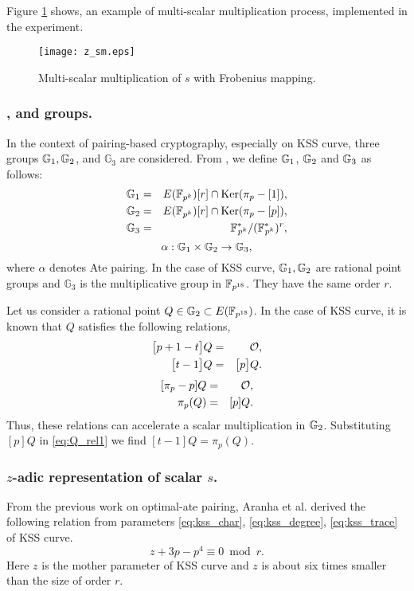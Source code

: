 Figure \ref{fig:z_sml} shows, an example of multi-scalar multiplication process, implemented in the experiment.
\begin{figure}[!ht]
\centering
\texttt{[image: z\_sm.eps]}
\caption{Multi-scalar multiplication of $s$ with Frobenius mapping.}
\label{fig:z_sml}
\end{figure}

\subsubsection{,  and  groups.} In the context of pairing-based cryptography, especially on KSS curve, three groups ${\mathbb{G}}_{1}, {\mathbb{G}}_{2}$, and $\mathbb{G}_3$ are considered. From \cite{mori}, we define ${\mathbb{G}}_{1}$, ${\mathbb{G}}_{2}$ and ${\mathbb{G}}_{3}$ as follows:
\begin{eqnarray}\label{eq:g1}
{\mathbb{G}}_{1} & = &  E({\mathbb{F}}_{p^{k}}) [r] \cap \text{Ker}(\pi_p - [1]), \nonumber \\
{\mathbb{G}}_{2} & = &  E({\mathbb{F}}_{p^{k}}) [r] \cap \text{Ker}(\pi_p - [p]), \nonumber \\
{\mathbb{G}}_{3} & = & {{\mathbb{F}}^{\ast}}_{\!\!\!p^{k}}/({{\mathbb{F}}^{\ast}}_{\!\!\!p^{k}})^r, \nonumber
\end{eqnarray}
\begin{equation}
\alpha : {\mathbb{G}}_{1} \times {\mathbb{G}}_{2} \rightarrow {\mathbb{G}}_{3},
\end{equation}
where $\alpha$ denotes Ate pairing. In the case of KSS curve, ${\mathbb{G}}_{1}, {\mathbb{G}}_{2}$ are rational point groups and $\mathbb{G}_3$ is the multiplicative group in $\mathbb{F}_{p^{18}}$. They have the same order $r$. 

Let us consider a rational point $Q\in {\mathbb{G}}_{2} \subset E({\mathbb{F}}_{p^{18}})$.
In the case of KSS curve, it is known that $Q$ satisfies the following relations,
\begin{eqnarray}\label{eq:Q_rel1}
\big[p+1-t\big]Q & = & \cal O, \nonumber \\
\big[t-1\big]Q  & = & \big[p\big]Q.
\end{eqnarray}
\begin{eqnarray}\label{eq:Q_rel2}
[\pi_p -p]Q & = &\cal O, \nonumber \\
\pi_p(Q) & = & [p]Q.
\end{eqnarray}
Thus, these relations can accelerate a scalar multiplication in ${\mathbb{G}}_{2}$.
Substituting $[p]Q$ in \eqref{eq:Q_rel1} we find $[t-1]Q = \pi_p(Q)$.

\subsubsection{$z$-adic representation of scalar $s$.}
From the previous work on optimal-ate pairing, Aranha et al. \cite{PAIRING:AFKMR12} derived the following relation from parameters \eqref{eq:kss_char}, \eqref{eq:kss_degree}, \eqref{eq:kss_trace} of KSS curve.
\begin{equation}\label{eq:aranha_relation}
z+3p-p^4 \equiv 0 \bmod {r}.
\end{equation}
Here $z$ is the mother parameter of KSS curve and $z$ is about six times smaller than the size of order $r$. 

